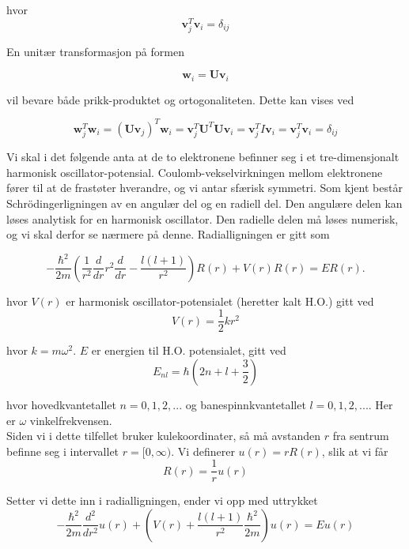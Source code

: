 \documentclass{article}
\begin{document}
hvor 
\[ \textbf{v}_j^T \textbf{v}_i = \delta_{ij} \]

En unitær transformasjon på formen

\[\textbf{w}_i = \textbf{Uv}_i \]

vil bevare både prikk-produktet og ortogonaliteten. Dette kan vises ved

\[ \textbf{w}_j^T \textbf{w}_i = (\textbf{Uv}_j)^T \textbf{w}_i = \textbf{v}_j^T \textbf{U}^T \textbf{Uv}_i = \textbf{v}_j^T I \textbf{v}_i = \textbf{v}_j^T \textbf{v}_i = \delta_{ij} \]



Vi skal i det følgende anta at de to elektronene befinner seg i et tre-dimensjonalt harmonisk oscillator-potensial. Coulomb-vekselvirkningen mellom elektronene fører til at de frastøter hverandre, og vi antar sfærisk symmetri. Som kjent består Schrödingerligningen av en angulær del og en radiell del. Den angulære delen kan løses analytisk for en harmonisk oscillator. Den radielle delen må løses numerisk, og vi skal derfor se nærmere på denne. Radialligningen er gitt som 

\begin{equation}
  -\frac{\hbar^2}{2 m} \left ( \frac{1}{r^2} \frac{d}{dr} r^2
  \frac{d}{dr} - \frac{l (l + 1)}{r^2} \right )R(r) 
     + V(r) R(r) = E R(r).
\end{equation}

hvor $V(r)$ er harmonisk oscillator-potensialet (heretter kalt H.O.) gitt ved
\begin{equation}
V(r) = \frac{1}{2}kr^2
\end{equation}

hvor $k = m\omega^2$. $E$ er energien til H.O. potensialet, gitt ved
\begin{equation}
E_{nl} = \hbar\left(2n + l + \frac{3}{2} \right)
\end{equation}

hvor hovedkvantetallet $n = 0,1,2,...$ og banespinnkvantetallet $l = 0,1,2,...$. Her er $\omega$ vinkelfrekvensen.\\

Siden vi i dette tilfellet bruker kulekoordinater, så må avstanden $r$ fra sentrum befinne seg i intervallet $r = [0, \infty)$. Vi definerer $u(r) = rR(r)$, slik at vi får 
\begin{equation}
R(r) = \frac{1}{r}u(r)
\end{equation}

Setter vi dette inn i radialligningen, ender vi opp med uttrykket 
\begin{equation}
  -\frac{\hbar^2}{2 m} \frac{d^2}{dr^2} u(r) 
       + \left ( V(r) + \frac{l (l + 1)}{r^2}\frac{\hbar^2}{2 m}
                                    \right ) u(r)  = E u(r)
\end{equation}
\end{document}
